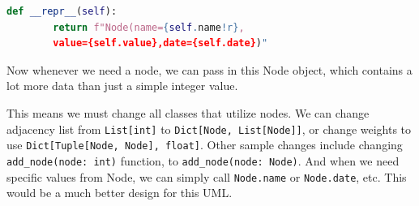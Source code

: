 \documentclass{article}
\begin{document}
\begin{onehalfspace}
\begin{lstlisting}[language=Python]
    def __repr__(self):
        return f"Node(name={self.name!r},
        value={self.value},date={self.date})"
\end{lstlisting}

Now whenever we need a node, we can pass in this Node object, which contains a lot more data than just a simple integer value.

This means we must change all classes that utilize nodes. We can change adjacency list from \texttt{List[int]} to \texttt{Dict[Node, List[Node]]}, or change weights to use \texttt{Dict[Tuple[Node, Node], float]}. Other sample changes include changing \texttt{add\_node(node: int)} function, to \texttt{add\_node(node: Node)}. And when we need specific values from Node, we can simply call \texttt{Node.name} or \texttt{Node.date}, etc. This would be a much better design for this UML.

\end{onehalfspace}
\end{document}
